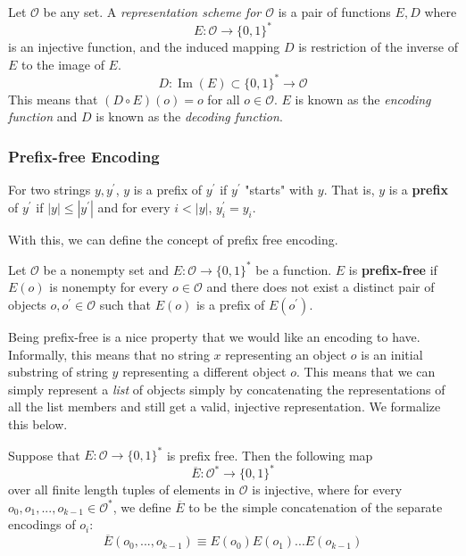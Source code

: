 \documentclass{article}
\DeclareMathOperator{\im}{Im}
\begin{document}
  \begin{definition}
  Let $\mathcal{O}$ be any set. A \textit{representation scheme for $\mathcal{O}$} is a pair of functions $E, D$ where 
  \[E: \mathcal{O} \longrightarrow \{0,1\}^*\]
  is an injective function, and the induced mapping $D$ is restriction of the inverse of $E$ to the image of $E$. 
  \[D: \im(E) \subset \{0,1\}^* \longrightarrow \mathcal{O}\]
  This means that $(D \circ E) (o) = o$ for all $o \in \mathcal{O}$. $E$ is known as the \textit{encoding function} and $D$ is known as the \textit{decoding function}. 
  \end{definition}

  \subsubsection{Prefix-free Encoding}
  \begin{definition}[Prefix]
  For two strings $y, y^\prime$, $y$ is a prefix of $y^\prime$ if $y^\prime$ "starts" with $y$. That is, $y$ is a \textbf{prefix} of $y^\prime$ if $|y| \leq |y^\prime|$ and for every $i<|y|$, $y_i^\prime = y_i$. 
  \end{definition}

  With this, we can define the concept of prefix free encoding. 

  \begin{definition}
  Let $\mathcal{O}$ be a nonempty set and $E: \mathcal{O} \longrightarrow \{0,1\}^*$ be a function. $E$ is \textbf{prefix-free} if $E(o)$ is nonempty for every $o \in \mathcal{O}$ and there does not exist a distinct pair of objects $o, o^\prime \in \mathcal{O}$ such that $E(o)$ is a prefix of $E(o^\prime)$. 
  \end{definition}

  Being prefix-free is a nice property that we would like an encoding to have. Informally, this means that no string $x$ representing an object $o$ is an initial substring of string $y$ representing a different object $o$. This means that we can simply represent a \textit{list} of objects simply by concatenating the representations of all the list members and still get a valid, injective representation. We formalize this below.

  \begin{theorem}
  Suppose that $E: \mathcal{O} \longrightarrow \{0,1\}^*$ is prefix free. Then the following map 
  \[\overline{E}: \mathcal{O}^* \longrightarrow \{0,1\}^*\]
  over all finite length tuples of elements in $\mathcal{O}$ is injective, where for every $o_0, o_1, ..., o_{k-1} \in \mathcal{O}^*$, we define $\overline{E}$ to be the simple concatenation of the separate encodings of $o_i$: 
  \[\overline{E} (o_0, ..., o_{k-1}) \equiv E(o_0) E(o_1) ... E(o_{k-1})\]
  \end{theorem}
\end{document}
